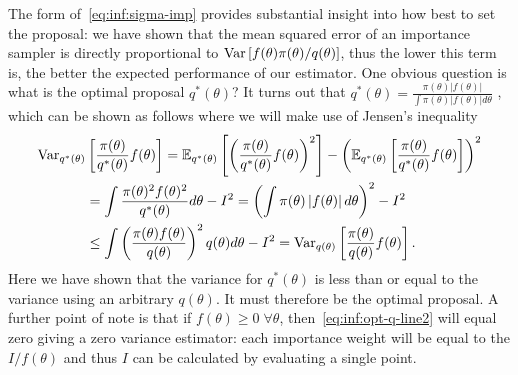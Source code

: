 The form of~\eqref{eq:inf:sigma-imp} provides substantial insight into how
best to set the proposal: we have shown that the mean squared error of an
importance sampler is directly proportional to $\mathrm{Var} \left[f(\theta)\pi(\theta)/q(\theta)\right]$,
thus the lower this term is, the better the expected performance of our
estimator.  One obvious question is what is the optimal proposal $q^*(\theta)$?
It turns out that $q^*(\theta) = \frac{\pi(\theta)\left|f(\theta)\right|}
{\int \pi(\theta)\left|f(\theta)\right|d\theta}$
\citep{kahn1953methods,owen2013mc}, which can be
 shown as follows where we will make use of Jensen's inequality
\begin{align}
\mathrm{Var}_{q^*(\theta)} &\left[\frac{\pi(\theta)}{q^*(\theta)} f(\theta)\right] =
\mathbb{E}_{q^*(\theta)} \left[\left(\frac{\pi(\theta)}{q^*(\theta)} f(\theta)\right)^2\right]
-\left(\mathbb{E}_{q^*(\theta)} \left[\frac{\pi(\theta)}{q^*(\theta)} f(\theta)\right]\right)^2
\nonumber \\
 &= \int \frac{\pi(\theta)^2 f(\theta)^2}{q^*(\theta)} d\theta
 -I^2 
 = \left(\int \pi(\theta) \left|f(\theta)\right| d\theta\right)^2
 -I^2 \label{eq:inf:opt-q-line2}\\
 &\le \int \left(\frac{\pi(\theta) f(\theta)}{q(\theta)}\right)^2 q(\theta) d\theta
 -I^2 =\mathrm{Var}_{q(\theta)} \left[\frac{\pi(\theta)}{q(\theta)} f(\theta)\right] \label{eq:inf:opt-q}.
\end{align}
Here we have shown that the variance for $q^*(\theta)$ is less than or equal to the variance
using an arbitrary $q(\theta)$.  It must therefore be the optimal proposal.
A further point of note is that if $f(\theta)\ge0 \; \forall \theta$, 
then~\eqref{eq:inf:opt-q-line2} will equal zero giving a zero variance estimator:
each importance weight will be equal to the  $I/f(\theta)$ and thus $I$
can be calculated by evaluating a single point.  

